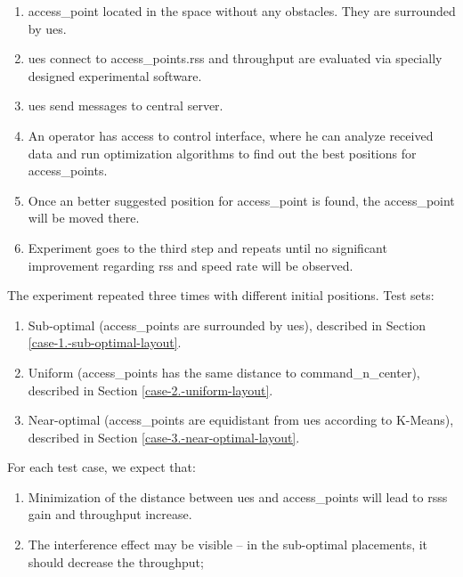 \begin{enumerate}
\def\labelenumi{\arabic{enumi}.}
\tightlist
\item
  \gls{access_point} located in the space without any obstacles. They are surrounded by
  \glspl{ue}.
\item
  \glspl{ue} connect to \glspl{access_point}.\Gls{rss} and throughput are evaluated via specially
  designed experimental software.
\item
  \Glspl{ue} send messages to central server.
\item
  An operator has access to control interface, where he can analyze received data
  and run optimization algorithms to find out the best positions for \glspl{access_point}.
\item
  Once an better suggested position for \gls{access_point} is found, the \gls{access_point} will be moved there.
\item
  Experiment goes to the third step and repeats until no significant
  improvement regarding \gls{rss} and speed rate will be observed.
\end{enumerate}

The experiment repeated three times with different initial positions. Test sets:

\begin{enumerate}
\def\labelenumi{\arabic{enumi}.}
\tightlist
\item
  Sub-optimal (\glspl{access_point} are surrounded by \glspl{ue}), described in Section \ref{case-1.-sub-optimal-layout}.
\item
Uniform (\glspl{access_point} has the same distance to \gls{command_n_center}), described in Section \ref{case-2.-uniform-layout}.  
\item
  Near-optimal (\glspl{access_point} are equidistant from \glspl{ue}  according to K-Means), described in Section \ref{case-3.-near-optimal-layout}.

\end{enumerate}

For each test case, we expect that:

\begin{enumerate}
\def\labelenumi{\arabic{enumi}.}
\tightlist
\item
  Minimization of the distance between \glspl{ue} and \glspl{access_point} will lead to \glspl{rss} gain and throughput increase.
\item
  The interference effect may be visible -- in the sub-optimal
  placements, it should decrease the throughput;
\end{enumerate}